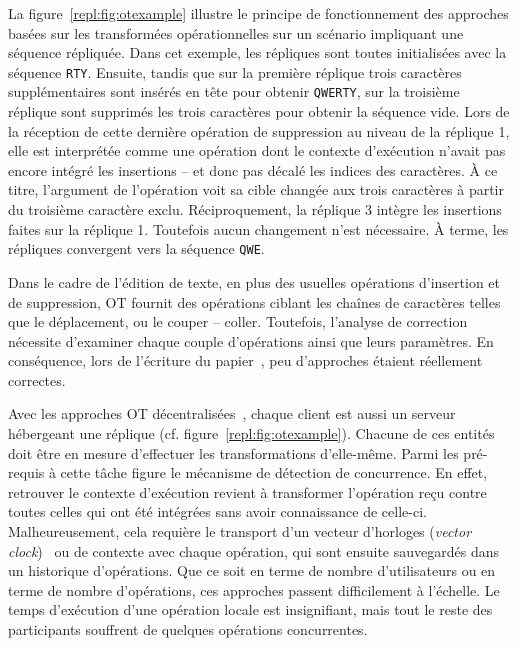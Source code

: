 La figure~\ref{repl:fig:otexample} illustre le principe de fonctionnement des
approches basées sur les transformées opérationnelles sur un scénario impliquant
une séquence répliquée. Dans cet exemple, les répliques sont toutes initialisées
avec la séquence \texttt{RTY}. Ensuite, tandis que sur la première réplique
trois caractères supplémentaires sont insérés en tête pour obtenir
\texttt{QWERTY}, sur la troisième réplique sont supprimés les trois caractères
pour obtenir la séquence vide. Lors de la réception de cette dernière opération
de suppression au niveau de la réplique 1, elle est interprétée comme une
opération dont le contexte d'exécution n'avait pas encore intégré les insertions
-- et donc pas décalé les indices des caractères. À ce titre, l'argument de
l'opération voit sa cible changée aux trois caractères à partir du troisième
caractère exclu. Réciproquement, la réplique 3 intègre les insertions faites sur
la réplique 1. Toutefois aucun changement n'est nécessaire. À terme, les
répliques convergent vers la séquence \texttt{QWE}.

Dans le cadre de l'édition de texte, en plus des usuelles opérations d'insertion
et de suppression, OT fournit des opérations ciblant les chaînes de caractères
telles que le déplacement, ou le couper -- coller. Toutefois, l'analyse de
correction nécessite d'examiner chaque couple d'opérations ainsi que leurs
paramètres. En conséquence, lors de l'écriture du
papier~\cite{imine2003proving}, peu d'approches étaient réellement correctes.


Avec les approches OT décentralisées~\cite{sun2009contextbased}, chaque client
est aussi un serveur hébergeant une réplique
(cf. figure~\ref{repl:fig:otexample}). Chacune de ces entités doit être en
mesure d'effectuer les transformations d'elle-même. Parmi les pré-requis à cette
tâche figure le mécanisme de détection de concurrence. En effet, retrouver le
contexte d'exécution revient à transformer l'opération reçu contre toutes celles
qui ont été intégrées sans avoir connaissance de celle-ci. Malheureusement, cela
requière le transport d'un vecteur d'horloges (\emph{vector
  clock})~\cite{lamport1978time} ou de contexte avec chaque opération, qui sont
ensuite sauvegardés dans un historique d'opérations. Que ce soit en terme de
nombre d'utilisateurs ou en terme de nombre d'opérations, ces approches passent
difficilement à l'échelle. Le temps d'exécution d'une opération locale est
insignifiant, mais tout le reste des participants souffrent de quelques
opérations concurrentes.

